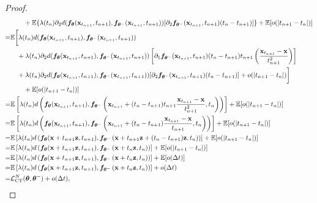 \begin{appendices}
\begin{proof}
\begin{align}
    &\qquad + \mbb{E}\{\lambda(t_n)\partial_2 d(\vf_\vtheta(\rvx_{t_{n+1}}, t_{n+1}),\vf_{\vtheta^{-}}(\rvx_{t_{n+1}}, t_{n+1}))[\partial_2 \vf_{\vtheta^{-}}(\rvx_{t_{n+1}}, t_{n+1}) (t_n-t_{n+1})]\} + \mbb{E}[o(|t_{n+1} - t_n|)]\notag\\
    =& \mbb{E}\bigg[\lambda(t_n)d(\vf_\vtheta(\rvx_{t_{n+1}}, t_{n+1}),\vf_{\vtheta^{-}}(\rvx_{t_{n+1}}, t_{n+1}))\notag \\
    &\quad + \lambda(t_n)\partial_2 d(\vf_\vtheta(\rvx_{t_{n+1}}, t_{n+1}),\vf_{\vtheta^{-}}(\rvx_{t_{n+1}}, t_{n+1}))\left[\partial_1\vf_{\vtheta^{-}}(\rvx_{t_{n+1}}, t_{n+1})(t_{n} - t_{n+1})t_{n+1} \left(\frac{\rvx_{t_{n+1}} - \rvx}{t_{n+1}^2} \right)\right] \notag \\
    &\quad +\lambda(t_n)\partial_2 d(\vf_\vtheta(\rvx_{t_{n+1}}, t_{n+1}),\vf_{\vtheta^{-}}(\rvx_{t_{n+1}}, t_{n+1}))[\partial_2 \vf_{\vtheta^{-}}(\rvx_{t_{n+1}}, t_{n+1}) (t_n-t_{n+1})] + o(|t_{n+1} - t_n|)\bigg] \notag\\
    &\qquad + \mbb{E}[o(|t_{n+1} - t_n|)]\notag \\
    =& \mbb{E}\left[\lambda(t_n) d\left(\vf_\vtheta(\rvx_{t_{n+1}}, t_{n+1}), \vf_{\vtheta^{-}}\left(\rvx_{t_{n+1}} + (t_{n} - t_{n+1})t_{n+1}\frac{\rvx_{t_{n+1}} - \rvx}{t_{n+1}^2} , t_n\right)\right)\right] + \mbb{E}[o(|t_{n+1} - t_n|)]\notag\\
    =& \mbb{E}\left[\lambda(t_n) d\left(\vf_\vtheta(\rvx_{t_{n+1}}, t_{n+1}), \vf_{\vtheta^{-}}\left(\rvx_{t_{n+1}} + (t_{n} - t_{n+1})\frac{\rvx_{t_{n+1}} - \rvx}{t_{n+1}} , t_n\right)\right)\right] + \mbb{E}[o(|t_{n+1} - t_n|)]\notag\\
    =& \mbb{E}\left[\lambda(t_n)d\left(\vf_\vtheta(\rvx + t_{n+1} \rvz, t_{n+1}), \vf_{\vtheta^{-}}\left(\rvx + t_{n+1}\rvz + (t_{n} - t_{n+1})\rvz , t_n\right)\right)\right] + \mbb{E}[o(|t_{n+1} - t_n|)]\notag\\
    =& \mbb{E}\left[\lambda(t_n)d\left(\vf_\vtheta(\rvx + t_{n+1} \rvz, t_{n+1}), \vf_{\vtheta^{-}}\left(\rvx + t_{n}\rvz , t_n\right)\right)\right] + \mbb{E}[o(|t_{n+1} - t_n|)]\notag\\
    =& \mbb{E}\left[\lambda(t_n)d\left(\vf_\vtheta(\rvx + t_{n+1} \rvz, t_{n+1}), \vf_{\vtheta^{-}}\left(\rvx + t_{n}\rvz , t_n\right)\right)\right] + \mbb{E}[o(\Delta t)]\notag\\
    =& \mbb{E}\left[\lambda(t_n)d\left(\vf_\vtheta(\rvx + t_{n+1} \rvz, t_{n+1}), \vf_{\vtheta^{-}}\left(\rvx + t_{n}\rvz , t_n\right)\right)\right] + o(\Delta t)\notag \\
    =& \mcal{L}_\text{CT}^N(\vtheta, \vtheta^{-}) + o(\Delta t),

\end{align}
\end{proof}
\end{appendices}
